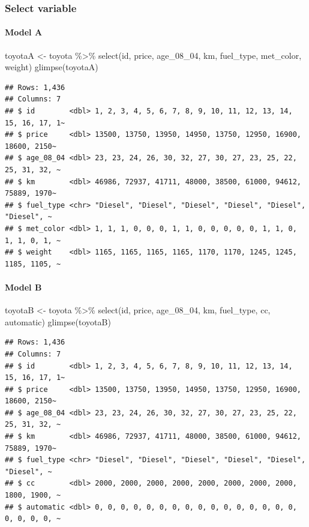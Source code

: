 \documentclass[
]{article}
\newenvironment{Shaded}{\begin{snugshade}}{\end{snugshade}}
\newcommand{\FunctionTok}[1]{\textcolor[rgb]{0.00,0.00,0.00}{#1}}
\newcommand{\NormalTok}[1]{#1}
\newcommand{\OtherTok}[1]{\textcolor[rgb]{0.56,0.35,0.01}{#1}}
\newcommand{\SpecialCharTok}[1]{\textcolor[rgb]{0.00,0.00,0.00}{#1}}
\begin{document}
\hypertarget{select-variable}{%
\subsubsection{Select variable}\label{select-variable}}

\hypertarget{model-a-1}{%
\paragraph{Model A}\label{model-a-1}}

\begin{Shaded}
\begin{Highlighting}[]
\NormalTok{toyotaA }\OtherTok{\textless{}{-}}\NormalTok{ toyota }\SpecialCharTok{\%\textgreater{}\%} 
  \FunctionTok{select}\NormalTok{(id, price, age\_08\_04, km, fuel\_type, met\_color, weight)}
\FunctionTok{glimpse}\NormalTok{(toyotaA)}
\end{Highlighting}
\end{Shaded}

\begin{verbatim}
## Rows: 1,436
## Columns: 7
## $ id        <dbl> 1, 2, 3, 4, 5, 6, 7, 8, 9, 10, 11, 12, 13, 14, 15, 16, 17, 1~
## $ price     <dbl> 13500, 13750, 13950, 14950, 13750, 12950, 16900, 18600, 2150~
## $ age_08_04 <dbl> 23, 23, 24, 26, 30, 32, 27, 30, 27, 23, 25, 22, 25, 31, 32, ~
## $ km        <dbl> 46986, 72937, 41711, 48000, 38500, 61000, 94612, 75889, 1970~
## $ fuel_type <chr> "Diesel", "Diesel", "Diesel", "Diesel", "Diesel", "Diesel", ~
## $ met_color <dbl> 1, 1, 1, 0, 0, 0, 1, 1, 0, 0, 0, 0, 0, 1, 1, 0, 1, 1, 0, 1, ~
## $ weight    <dbl> 1165, 1165, 1165, 1165, 1170, 1170, 1245, 1245, 1185, 1105, ~
\end{verbatim}

\hypertarget{model-b-1}{%
\paragraph{Model B}\label{model-b-1}}

\begin{Shaded}
\begin{Highlighting}[]
\NormalTok{toyotaB }\OtherTok{\textless{}{-}}\NormalTok{ toyota }\SpecialCharTok{\%\textgreater{}\%} 
  \FunctionTok{select}\NormalTok{(id, price, age\_08\_04, km, fuel\_type, cc, automatic)}
\FunctionTok{glimpse}\NormalTok{(toyotaB)}
\end{Highlighting}
\end{Shaded}

\begin{verbatim}
## Rows: 1,436
## Columns: 7
## $ id        <dbl> 1, 2, 3, 4, 5, 6, 7, 8, 9, 10, 11, 12, 13, 14, 15, 16, 17, 1~
## $ price     <dbl> 13500, 13750, 13950, 14950, 13750, 12950, 16900, 18600, 2150~
## $ age_08_04 <dbl> 23, 23, 24, 26, 30, 32, 27, 30, 27, 23, 25, 22, 25, 31, 32, ~
## $ km        <dbl> 46986, 72937, 41711, 48000, 38500, 61000, 94612, 75889, 1970~
## $ fuel_type <chr> "Diesel", "Diesel", "Diesel", "Diesel", "Diesel", "Diesel", ~
## $ cc        <dbl> 2000, 2000, 2000, 2000, 2000, 2000, 2000, 2000, 1800, 1900, ~
## $ automatic <dbl> 0, 0, 0, 0, 0, 0, 0, 0, 0, 0, 0, 0, 0, 0, 0, 0, 0, 0, 0, 0, ~
\end{verbatim}
\end{document}
